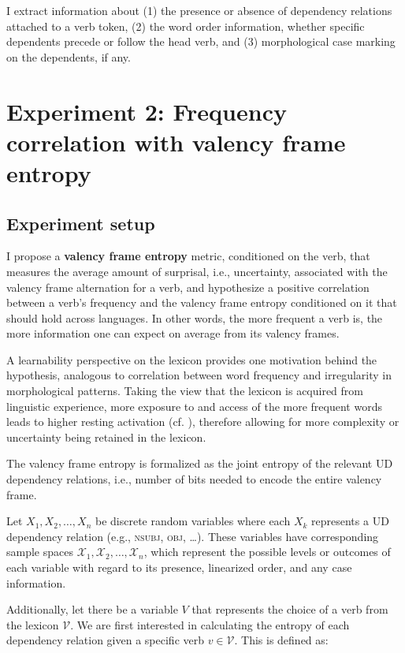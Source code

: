 I extract information about (1) the presence or absence of dependency relations attached to a verb token, (2) the word order information, whether specific dependents precede or follow the head verb, and (3) morphological case marking on the dependents, if any.


\section{Experiment 2: Frequency correlation with valency frame entropy}

\subsection{Experiment setup}

I propose a \textbf{valency frame entropy} metric, conditioned on the verb, that measures the average amount of surprisal, i.e., uncertainty, associated with the valency frame alternation for a verb, and hypothesize a positive correlation between a verb's frequency and the valency frame entropy conditioned on it that should hold across languages. In other words, the more frequent a verb is, the more information one can expect on average from its valency frames.

A learnability perspective on the lexicon provides one motivation behind the hypothesis, analogous to correlation between word frequency and irregularity in morphological patterns. Taking the view that the lexicon is acquired from linguistic experience, more exposure to and access of the more frequent words leads to higher resting activation (cf. \citealp*{bybee1998}), therefore allowing for more complexity or uncertainty being retained in the lexicon.

The valency frame entropy is formalized as the joint entropy of the relevant UD dependency relations, i.e., number of bits needed to encode the entire valency frame.

Let $X_1, X_2,\ldots,X_n$ be discrete random variables where each $X_k$ represents a UD dependency relation (e.g., \textsc{nsubj}, \textsc{obj}, \ldots). These variables have corresponding sample spaces $\mathcal{X}_1, \mathcal{X}_2, \ldots, \mathcal{X}_n$, which represent the possible levels or outcomes of each variable with regard to its presence, linearized order, and any case information.

Additionally, let there be a variable $V$ that represents the choice of a verb from the lexicon $\mathcal{V}$. We are first interested in calculating the entropy of each dependency relation given a specific verb $v \in \mathcal{V}$. This is defined as:


